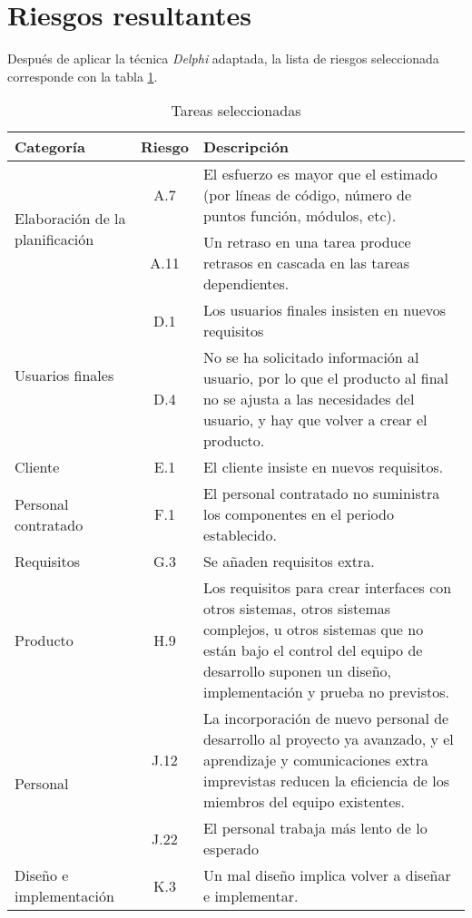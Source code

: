 \documentclass[11pt,a4paper,spanish,twoside]{book}
\begin{document}
\section{Riesgos resultantes}
Después de aplicar la técnica \emph{Delphi} adaptada, la lista de riesgos
seleccionada corresponde con la tabla \ref{Tab:tar_sel}.
\begin{table}[!ht]
  \centering
  \begin{tabular}{|p{3.5cm}|c|p{6.5cm}|}
    \hline
    \textbf{Categoría} & \textbf{Riesgo} & \textbf{Descripción} \\
    \hline\hline
    \multirow{2}{3.5cm}{Elaboración de la planificación}
    & A.7 & El esfuerzo es mayor que el estimado (por líneas de código,
    número de puntos función, módulos, etc). \\  
    \cline{2-3}
    & A.11 & Un retraso en una tarea produce retrasos en cascada en las
    tareas dependientes. \\
    \hline \hline
    \multirow{2}{3cm}{Usuarios finales}
    & D.1 & Los usuarios finales insisten en nuevos requisitos\\
    \cline{2-3}
    & D.4 & No se ha solicitado información al usuario, por lo que el producto
    al final  no se ajusta a las necesidades del usuario, y hay que volver a
    crear el producto.\\
    \hline \hline
    Cliente & E.1 & El cliente insiste en nuevos requisitos.\\
    \hline \hline
    Personal contratado & F.1 & El personal contratado no suministra los
    componentes en el periodo establecido.\\
    \hline \hline
    Requisitos & G.3 & Se añaden requisitos extra.\\
    \hline \hline
    Producto & H.9 &  Los requisitos para crear interfaces con otros
    sistemas, otros sistemas complejos, u otros sistemas que no están bajo el
    control del equipo de desarrollo suponen un diseño, implementación y
    prueba no previstos.\\ 
    \hline \hline
    \multirow{2}{3.5cm}{Personal}
    & J.12 & La incorporación de nuevo personal de desarrollo al proyecto ya
    avanzado, y el aprendizaje y comunicaciones extra imprevistas reducen la
    eficiencia de los miembros del equipo existentes.\\ 
    \cline{2-3}
    & J.22 & El personal trabaja más lento de lo esperado\\
    \hline \hline
    \multirow{1}{3.5cm}{Diseño e implementación}
    & K.3 & Un mal diseño implica volver a diseñar e implementar.\\
   \hline
  \end{tabular}
  \caption{Tareas seleccionadas}
  \label{Tab:tar_sel}
\end{table}
\end{document}
